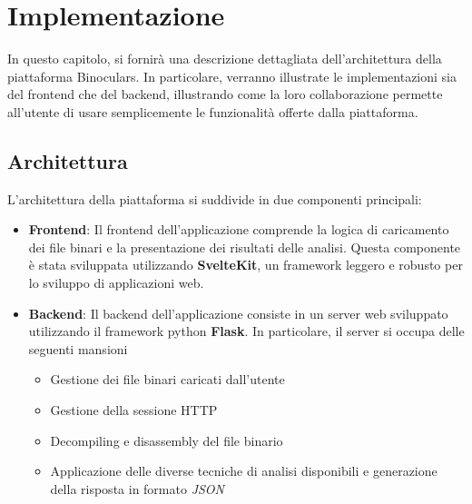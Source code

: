\documentclass[../main.tex]{subfiles}
\begin{document}
\chapter{Implementazione}
In questo capitolo, si fornirà una descrizione dettagliata dell'architettura della piattaforma Binoculars.
In particolare, verranno illustrate le implementazioni sia del frontend che del backend,
illustrando come la loro collaborazione permette all'utente di usare semplicemente le funzionalità offerte dalla piattaforma.
\section{Architettura}
L'architettura della piattaforma si suddivide in due componenti principali:
\begin{itemize}
    \item \textbf{Frontend}: Il frontend dell'applicazione comprende la logica di caricamento dei file binari e la presentazione
    dei risultati delle analisi. Questa componente è stata sviluppata utilizzando \textbf{SvelteKit}, un framework leggero e robusto per lo sviluppo
    di applicazioni web.
    \item \textbf{Backend}: Il backend dell'applicazione consiste in un server web sviluppato utilizzando il framework python \textbf{Flask}.
    In particolare, il server si occupa delle seguenti mansioni
    \begin{itemize}
        \item Gestione dei file binari caricati dall'utente
        \item Gestione della sessione HTTP
        \item Decompiling e disassembly del file binario
        \item Applicazione delle diverse tecniche di analisi disponibili e generazione della risposta in formato \textit{JSON}
    \end{itemize}
\end{itemize}
\end{document}
